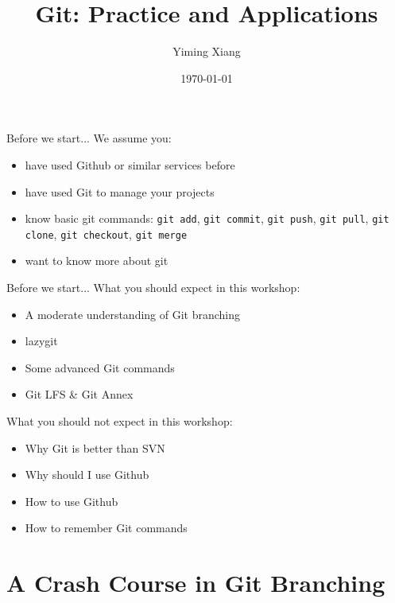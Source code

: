 \documentclass[aspectratio=169]{beamer}
\title{Git: Practice and Applications}
\author{Yiming Xiang}
\institute{UM-SJTU Joint Institute}
\date{\today}
\begin{document}
\frame{\titlepage}

\begin{frame}{Before we start...}
    We assume you:
    \pause
    \begin{itemize}[<+->]
        \item have used Github or similar services before
        \item have used Git to manage your projects
        \item know basic git commands: \texttt{git add}, \texttt{git commit}, \texttt{git push}, \texttt{git pull}, \texttt{git clone}, \texttt{git checkout}, \texttt{git merge}
        \item want to know more about git
    \end{itemize}
\end{frame}

\begin{frame}{Before we start...}
    What you should expect in this workshop:
    \begin{itemize}
        \item A moderate understanding of Git branching
        \item lazygit
        \item Some advanced Git commands
        \item Git LFS \& Git Annex
    \end{itemize}

    \pause

    What you should not expect in this workshop:
    \begin{itemize}
        \item Why Git is better than SVN
        \item Why should I use Github
        \item How to use Github
        \item How to remember Git commands
    \end{itemize}
\end{frame}

\section{A Crash Course in Git Branching}
\end{document}
